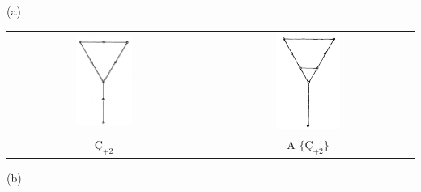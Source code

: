 \documentclass[11pt]{amsbook}
\begin{document}
\begin{center}
	(a)
\end{center}

\begin{center}
	\begin{tabular}{cc}
		\includegraphics[width=0.3\textwidth]{images/5}
		&
		\quad \includegraphics[width=0.32\textwidth]{images/6}\\

		$Ç_{+2}$
		&
		\quad A $\{Ç_{+2}\}$
	\end{tabular}
\end{center}

\begin{center}
	(b)
\end{center}
\end{document}
